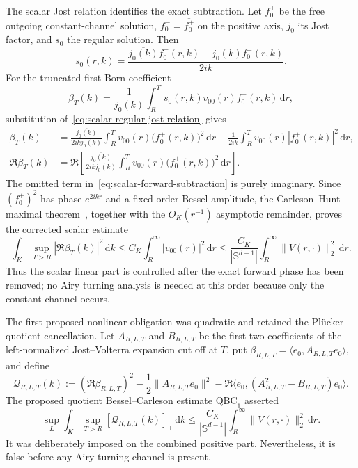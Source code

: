 \documentclass[11pt]{article}
\newcommand{\Sd}{\mathbb S^{d-1}}
\newcommand{\dd}{\,\mathrm d}
\theoremstyle{definition}
\theoremstyle{remark}
\begin{document}
The scalar Jost relation identifies the exact subtraction.  Let $f_0^+$ be the free outgoing constant-channel solution, $f_0^-=\overline{f_0^+}$ on the positive axis, $j_0$ its Jost factor, and $s_0$ the regular solution.  Then
\begin{equation}
 s_0(r,k)=\frac{\overline{j_0(k)}f_0^+(r,k)-j_0(k)f_0^-(r,k)}{2ik}.
 \label{eq:scalar-regular-jost-relation}
\end{equation}
For the truncated first Born coefficient
\begin{equation}
 \beta_T(k)=\frac1{j_0(k)}\int_R^T
 s_0(r,k)v_{00}(r)f_0^+(r,k)\dd r,
 \label{eq:scalar-beta-T}
\end{equation}
substitution of~\eqref{eq:scalar-regular-jost-relation} gives
\begin{align}
 \beta_T(k)
 &=\frac{\overline{j_0(k)}}{2ikj_0(k)}
   \int_R^T v_{00}(r)\bigl(f_0^+(r,k)\bigr)^2\dd r
   -\frac1{2ik}\int_R^T v_{00}(r)|f_0^+(r,k)|^2\dd r,
 \label{eq:scalar-forward-splitting}\\
 \Re\beta_T(k)
 &=\Re\!\left[
   \frac{\overline{j_0(k)}}{2ikj_0(k)}
   \int_R^T v_{00}(r)\bigl(f_0^+(r,k)\bigr)^2\dd r
  \right].
 \label{eq:scalar-forward-subtraction}
\end{align}
The omitted term in~\eqref{eq:scalar-forward-subtraction} is purely imaginary.  Since $(f_0^+)^2$ has phase $e^{2ikr}$ and a fixed-order Bessel amplitude, the Carleson--Hunt maximal theorem~\cite{Hunt1968}, together with the $O_K(r^{-1})$ asymptotic remainder, proves the corrected scalar estimate
\begin{equation}
 \int_K\sup_{T>R}|\Re\beta_T(k)|^2\dd k
 \leq C_K\int_R^\infty|v_{00}(r)|^2\dd r
 \leq\frac{C_K}{|\Sd|}
      \int_R^\infty\|V(r,\cdot)\|_2^2\dd r.
 \label{eq:scalar-renormalized-carleson}
\end{equation}
Thus the scalar linear part is controlled after the exact forward phase has been removed; no Airy turning analysis is needed at this order because only the constant channel occurs.

The first proposed nonlinear obligation was quadratic and retained the
Pl\"ucker quotient cancellation.  Let $A_{R,L,T}$ and $B_{R,L,T}$ be the first
two coefficients of the left-normalized Jost--Volterra expansion cut off at
$T$, put $\beta_{R,L,T}=\langle e_0,A_{R,L,T}e_0\rangle$, and define
\begin{equation}
 \mathcal Q_{R,L,T}(k)
 :=(\Re\beta_{R,L,T})^2
 -\frac12\|A_{R,L,T}e_0\|^2
 -\Re\langle e_0,(A_{R,L,T}^2-B_{R,L,T})e_0\rangle.
 \label{eq:QBC1-integrand}
\end{equation}
The proposed quotient Bessel--Carleson estimate $\mathrm{QBC}_1$ asserted
\begin{equation}
 \sup_{L}\int_K\sup_{T>R}
 [\mathcal Q_{R,L,T}(k)]_+\dd k
 \leq\frac{C_K}{|\Sd|}
 \int_R^\infty\|V(r,\cdot)\|_2^2\dd r.
 \label{eq:QBC1}
\end{equation}
It was deliberately imposed on the combined positive part.  Nevertheless, it
is false before any Airy turning channel is present.
\end{document}
